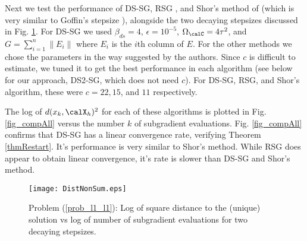 Next we test the performance of DS-SG, RSG \cite{yang2015rsg}, and Shor's method of \cite[Sec. 2.3]{shor2012minimization} (which is very similar to Goffin's stepsize \cite{goffin1977convergence}), alongside the two decaying stepsizes discussed in Fig. \ref{fig_decay}.  For DS-SG we used $\beta_{ds}=4$, $\epsilon=10^{-5}$, $\Omega_{\calC}=4\tau^2$, and $G=\sum_{i=1}^n\|E_i\|$ where $E_i$ is the $i$th column of $E$. For the other methods we chose the parameters in the way suggested by the authors.
 Since $c$ is difficult to estimate, we tuned it to get the best performance in each algorithm (see below for our approach, DS2-SG, which does not need $c$). For DS-SG, RSG, and Shor's algorithm, these were $c=22,15$, and $11$ respectively. 

The log of $d(x_k,\calX_h)^2$ for each of these algorithms is plotted in Fig. \ref{fig_compAll} versus the number $k$ of subgradient evaluations.
Fig. \ref{fig_compAll} confirms that DS-SG has a linear convergence rate, verifying Theorem \ref{thmRestart}. It's performance is very similar to Shor's method. While RSG does appear to obtain linear convergence, it's rate is slower than DS-SG and Shor's method. %

\begin{figure}
\centering
\texttt{[image: DistNonSum.eps]}
\caption{Problem (\ref{prob_l1_l1}): Log of square distance to the (unique) solution vs log of number of subgradient evaluations for two decaying stepsizes.}
\label{fig_decay}
\end{figure}

